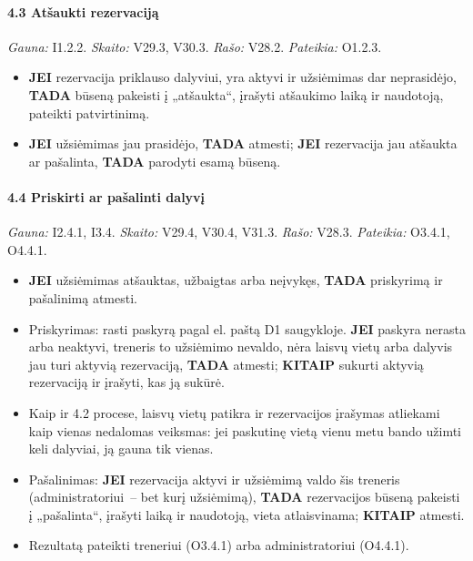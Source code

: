 \paragraph{4.3 Atšaukti rezervaciją}\mbox{}\par
{\small \textit{Gauna:} I1.2.2. \textit{Skaito:} V29.3, V30.3. \textit{Rašo:} V28.2. \textit{Pateikia:} O1.2.3.}
\begin{itemize}
  \item \textbf{JEI} rezervacija priklauso dalyviui, yra aktyvi ir užsiėmimas dar neprasidėjo, \textbf{TADA} būseną pakeisti į „atšaukta“, įrašyti atšaukimo laiką ir naudotoją, pateikti patvirtinimą.
  \item \textbf{JEI} užsiėmimas jau prasidėjo, \textbf{TADA} atmesti; \textbf{JEI} rezervacija jau atšaukta ar pašalinta, \textbf{TADA} parodyti esamą būseną.
\end{itemize}
\paragraph{4.4 Priskirti ar pašalinti dalyvį}\mbox{}\par
{\small \textit{Gauna:} I2.4.1, I3.4. \textit{Skaito:} V29.4, V30.4, V31.3. \textit{Rašo:} V28.3. \textit{Pateikia:} O3.4.1, O4.4.1.}
\begin{itemize}
  \item \textbf{JEI} užsiėmimas atšauktas, užbaigtas arba neįvykęs, \textbf{TADA} priskyrimą ir pašalinimą atmesti.
  \item Priskyrimas: rasti paskyrą pagal el. paštą D1 saugykloje. \textbf{JEI} paskyra nerasta arba neaktyvi, treneris to užsiėmimo nevaldo, nėra laisvų vietų arba dalyvis jau turi aktyvią rezervaciją, \textbf{TADA} atmesti; \textbf{KITAIP} sukurti aktyvią rezervaciją ir įrašyti, kas ją sukūrė.
  \item Kaip ir 4.2 procese, laisvų vietų patikra ir rezervacijos įrašymas atliekami kaip vienas nedalomas veiksmas: jei paskutinę vietą vienu metu bando užimti keli dalyviai, ją gauna tik vienas.
  \item Pašalinimas: \textbf{JEI} rezervacija aktyvi ir užsiėmimą valdo šis treneris (administratoriui~– bet kurį užsiėmimą), \textbf{TADA} rezervacijos būseną pakeisti į „pašalinta“, įrašyti laiką ir naudotoją, vieta atlaisvinama; \textbf{KITAIP} atmesti.
  \item Rezultatą pateikti treneriui (O3.4.1) arba administratoriui (O4.4.1).
\end{itemize}
